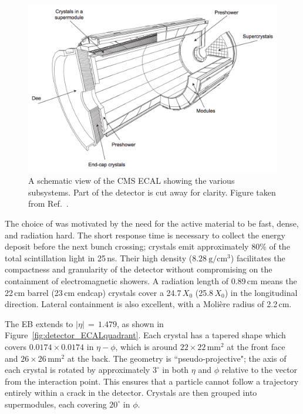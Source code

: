 \begin{figure}[h!]
  \centering
  \includegraphics[width=\textwidth]{Figures/Detector/ECALschematic.png}
  \caption[Schematic view of the CMS ECAL.]
  {
    A schematic view of the CMS ECAL showing the various subsystems.
    Part of the detector is cut away for clarity.
    Figure taken from Ref.~\cite{ECALperformance}.
  }
  \label{fig:detector_ECALschematic}
\end{figure}

The choice of \pbw was motivated by the need for the active material to be fast, dense, and radiation hard.
The short response time is necessary to collect the energy deposit before the next bunch crossing; 
\pbw crystals emit approximately 80\% of the total scintillation light in 25\,ns.
Their high density ($\SI{8.28}{\gram\per\centi\metre^3}$) facilitates the compactness and granularity of the detector without compromising on the containment of electromagnetic showers.
A radiation length of 0.89\,cm means the 22\,cm barrel (23\,cm endcap) crystals cover a 24.7\,$X_0$ (25.8\,$X_0$) in the longitudinal direction. %
Lateral containment is also excellent, with a Moli\`ere radius of 2.2\,cm. %

The EB extends to $|\eta|\,=\,1.479$, as shown in Figure~\ref{fig:detector_ECALquadrant}.
Each crystal has a tapered shape which covers $0.0174\times0.0174$ in $\eta-\phi$, 
which is around $22\times22\,\textrm{mm}^2$ at the front face and $26\times26\,\textrm{mm}^2$ at the back.
The geometry is ``pseudo-projective"; the axis of each crystal is rotated by approximately $3^{\circ}$ in both $\eta$ and $\phi$ relative to the vector from the interaction point.
This ensures that a particle cannot follow a trajectory entirely within a crack in the detector.
Crystals are then grouped into supermodules, each covering $20^{\circ}$ in $\phi$.

